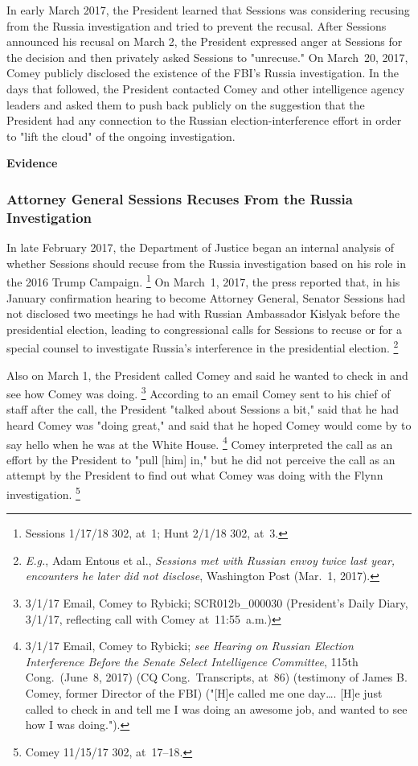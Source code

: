 In early March 2017, the President learned that Sessions was considering recusing from the Russia investigation and tried to prevent the recusal.
After Sessions announced his recusal on March 2, the President expressed anger at Sessions for the decision and then privately asked Sessions to "unrecuse."
On March~20, 2017, Comey publicly disclosed the existence of the FBI's Russia investigation.
In the days that followed, the President contacted Comey and other intelligence agency leaders and asked them to push back publicly on the suggestion that the President had any connection to the Russian election-interference effort in order to "lift the cloud" of the ongoing investigation.

\begin{center}
\textbf{Evidence}
\end{center}

\subsubsection{Attorney General Sessions Recuses From the Russia Investigation}

In late February 2017, the Department of Justice began an internal analysis of whether Sessions should recuse from the Russia investigation based on his role in the 2016 Trump Campaign.%
\footnote{Sessions 1/17/18 302, at~1;
Hunt 2/1/18 302, at~3.}
On March~1, 2017, the press reported that, in his January confirmation hearing to become Attorney General, Senator Sessions had not disclosed two meetings he had with Russian Ambassador Kislyak before the presidential election, leading to congressional calls for Sessions to recuse or for a special counsel to investigate Russia's interference in the presidential election.%
\footnote{\textit{E.g.}, Adam Entous et al., \textit{Sessions met with Russian envoy twice last year, encounters he later did not disclose}, Washington Post (Mar.~1, 2017).}

Also on March 1, the President called Comey and said he wanted to check in and see how Comey was doing.%
\footnote{3/1/17 Email, Comey to Rybicki;
SCR012b\_000030 (President's Daily Diary, 3/1/17, reflecting call with Comey at~11:55~a.m.)}
According to an email Comey sent to his chief of staff after the call, the President "talked about Sessions a bit," said that he had heard Comey was "doing great," and said that he hoped Comey would come by to say hello when he was at the White House.%
\footnote{3/1/17 Email, Comey to Rybicki;
\textit{see Hearing on Russian Election Interference Before the Senate Select Intelligence Committee}, 115th Cong.\ (June~8, 2017) (CQ Cong.\ Transcripts, at~86) (testimony of James B. Comey, former Director of the FBI) ("[H]e called me one day\dots. [H]e just called to check in and tell me I was doing an awesome job, and wanted to see how I was doing.").}
Comey interpreted the call as an effort by the President to "pull [him] in," but he did not perceive the call as an attempt by the President to find out what Comey was doing with the Flynn investigation.%
\footnote{Comey 11/15/17 302, at~17--18.}

